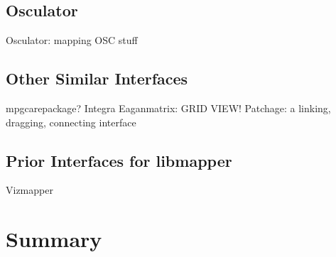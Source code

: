 	\subsection{Osculator}
		Osculator: mapping OSC stuff 
	\subsection{Other Similar Interfaces}
		mpgcarepackage?
		Integra 
		Eaganmatrix: GRID VIEW! 
		Patchage: a linking, dragging, connecting interface 
	\subsection{Prior Interfaces for libmapper} \label{sec:priorGUIs}
		Vizmapper 
	

\section{Summary}
	